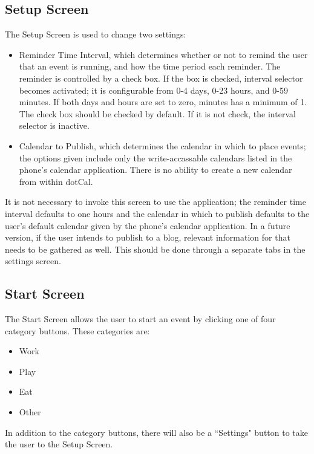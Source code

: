\documentclass[11pt]{article}
\begin{document}
\subsection{Setup Screen} 

The Setup Screen is used to change two settings:

\begin{itemize}
	\item{Reminder Time Interval, which determines whether or not to remind the user that an event is running, and how the time period each reminder. The reminder is controlled by a check box. If the box is checked, interval selector becomes activated; it is configurable from 0-4 days, 0-23 hours, and 0-59 minutes. If both days and hours are set to zero, minutes has a minimum of 1. The check box should be checked by default. If it is not check, the interval selector is inactive.}
	\item{Calendar to Publish, which determines the calendar in which to place events; the options given include only the write-accassable calendars listed in the phone's calendar application. There is no ability to create a new calendar from within dotCal.}
\end{itemize}

It is not necessary to invoke this screen to use the application; the reminder time interval defaults to one hours and the calendar in which to publish defaults to the user's default calendar given by the phone's calendar application. In a future version, if the user intends to publish to a blog, relevant information for that needs to be gathered as well. This should be done through a separate tabs in the settings screen. 


\subsection{Start Screen}

The Start Screen allows the user to start an event by clicking one of four category buttons. These categories are:

\begin{itemize}
	\item{Work} 
	\item{Play}
	\item{Eat}
	\item{Other}
\end{itemize}

In addition to the category buttons, there will also be a ``Settings" button to take the user to the Setup Screen.
\end{document}
